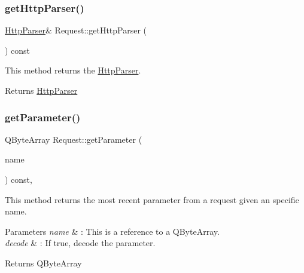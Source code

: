\subsubsection{\texorpdfstring{get\+Http\+Parser()}{getHttpParser()}}
{\footnotesize\ttfamily \hyperlink{class_http_parser}{Http\+Parser}\& Request\+::get\+Http\+Parser (\begin{DoxyParamCaption}{ }\end{DoxyParamCaption}) const\hspace{0.3cm}{\ttfamily [inline]}}



This method returns the \hyperlink{class_http_parser}{Http\+Parser}. 

\begin{DoxyReturn}{Returns}
\hyperlink{class_http_parser}{Http\+Parser} 
\end{DoxyReturn}
\mbox{\label{class_request_a0a78d7b29f1c0d96f101df866c82cef5}} 
\subsubsection{\texorpdfstring{get\+Parameter()}{getParameter()}}
{\footnotesize\ttfamily Q\+Byte\+Array Request\+::get\+Parameter (\begin{DoxyParamCaption}\item[{const Q\+Byte\+Array \&}]{name }\end{DoxyParamCaption}) const\hspace{0.3cm}{\ttfamily [inline]}, {\ttfamily [noexcept]}}



This method returns the most recent parameter from a request given an specific name. 


\begin{DoxyParams}{Parameters}
{\em name} & \+: This is a reference to a Q\+Byte\+Array. \\
\hline
{\em decode} & \+: If true, decode the parameter. \\
\hline
\end{DoxyParams}
\begin{DoxyReturn}{Returns}
Q\+Byte\+Array 
\end{DoxyReturn}
\mbox{\label{class_request_a46c49de1519d33ee2ff3cbe5a2874fc9}} 
